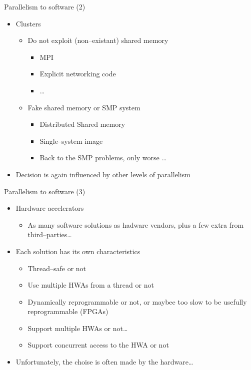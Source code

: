 \documentclass{beamer}
\begin{document}
\begin{frame}{Parallelism to software (2)}

  \begin{itemize}
  \item Clusters
    \begin{itemize}
    \item Do not exploit (non--existant) shared memory
      \begin{itemize}
      \item MPI
      \item Explicit networking code
      \item \ldots
      \end{itemize}
    \item Fake shared memory or SMP system
      \begin{itemize}
      \item Distributed Shared memory
      \item Single--system image
      \item Back to the SMP problems, only worse \ldots
      \end{itemize}
    \end{itemize}
  \item Decision is again influenced by other levels of parallelism
  \end{itemize}
\end{frame}

\begin{frame}{Parallelism to software (3)}

  \begin{itemize}
  \item Hardware accelerators 
    \begin{itemize}
    \item As many software solutions as hadware vendors, plus a few
      extra from third--parties\ldots
    \end{itemize}
  \item Each solution has its own characteristics
    \begin{itemize}
    \item Thread--safe or not
    \item Use multiple HWAs from a thread or not
    \item Dynamically reprogrammable or not, or maybee too slow
      to be usefully reprogrammable (FPGAs)
    \item Support multiple HWAs or not\ldots
    \item Support concurrent access to the HWA or not
    \end{itemize}
  \item Unfortunately, the choise is often made by the hardware\ldots
  \end{itemize}
\end{frame}
\end{document}
